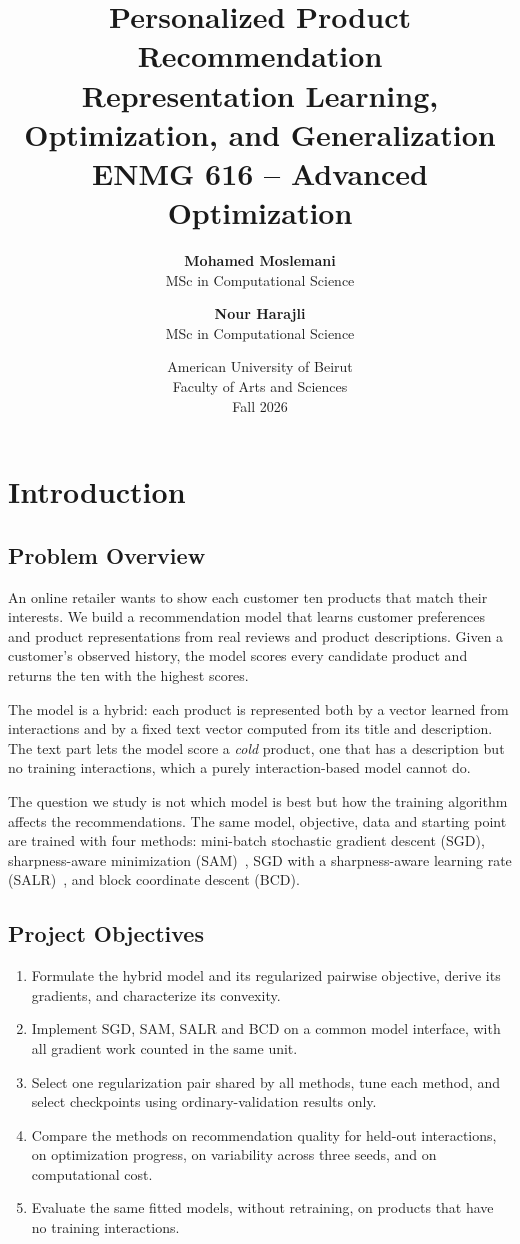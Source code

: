 \documentclass[12pt,a4paper]{article}
\title{
    \textbf{Personalized Product Recommendation}\\[0.3cm]
    \large Representation Learning, Optimization, and Generalization\\[0.5cm]
    \normalsize ENMG 616 -- Advanced Optimization
}
\author{
    \textbf{Mohamed Moslemani}\\
    MSc in Computational Science\\
    \and
    \textbf{Nour Harajli}\\
    MSc in Computational Science
}
\date{
    American University of Beirut\\
    Faculty of Arts and Sciences\\[0.3cm]
    Fall 2026
}
\begin{document}
\maketitle
\thispagestyle{empty}

\newpage
\tableofcontents
\newpage

\section{Introduction}

\subsection{Problem Overview}

An online retailer wants to show each customer ten products that match their
interests. We build a recommendation model that learns customer preferences
and product representations from real reviews and product descriptions. Given
a customer's observed history, the model scores every candidate product and
returns the ten with the highest scores.

The model is a hybrid: each product is represented both by a vector learned
from interactions and by a fixed text vector computed from its title and
description. The text part lets the model score a \emph{cold} product, one
that has a description but no training interactions, which a purely
interaction-based model cannot do.

The question we study is not which model is best but how the training
algorithm affects the recommendations. The same model, objective, data and
starting point are trained with four methods: mini-batch stochastic gradient
descent (SGD), sharpness-aware minimization (SAM)~\cite{sam}, SGD with a
sharpness-aware learning rate (SALR)~\cite{salr}, and block coordinate descent
(BCD).

\subsection{Project Objectives}

\begin{enumerate}
    \item Formulate the hybrid model and its regularized pairwise objective,
    derive its gradients, and characterize its convexity.
    \item Implement SGD, SAM, SALR and BCD on a common model interface, with
    all gradient work counted in the same unit.
    \item Select one regularization pair shared by all methods, tune each
    method, and select checkpoints using ordinary-validation results only.
    \item Compare the methods on recommendation quality for held-out
    interactions, on optimization progress, on variability across three
    seeds, and on computational cost.
    \item Evaluate the same fitted models, without retraining, on products
    that have no training interactions.
\end{enumerate}
\end{document}

